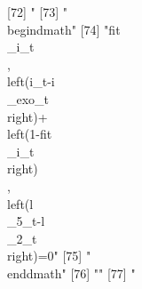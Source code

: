 [72] "%
[73] "\\begin{dmath}"                                                                                                                                                                                                                                                                                                                              
[74] "{{fit\\_i}_{t}}\\, \\left({i_{t}}-{{i\\_exo}_{t}}\\right)+\\left(1-{{fit\\_i}_{t}}\\right)\\, \\left({{l\\_5}_{t}}-{{l\\_2}_{t}}\\right)=0"                                                                                                                                                                                                  
[75] "\\end{dmath}"                                                                                                                                                                                                                                                                                                                                
[76] ""                                                                                                                                                                                                                                                                                                                                            
[77] "%

